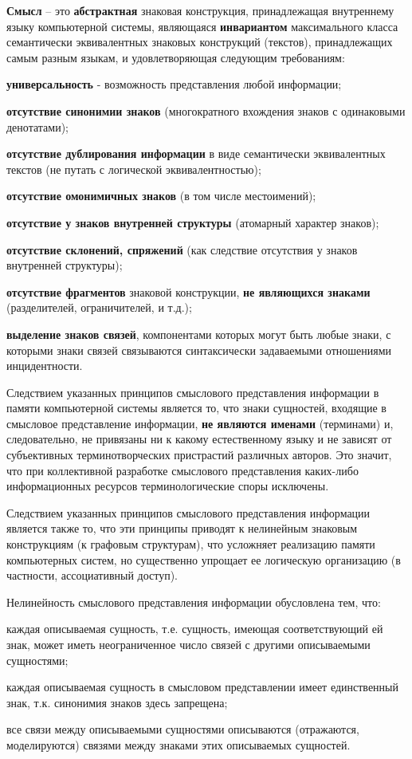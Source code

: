 \begin{SCn}
{\textbf{Смысл} – это \textbf{абстрактная} знаковая конструкция, принадлежащая внутреннему языку компьютерной системы, являющаяся \textbf{инвариантом} максимального класса семантически эквивалентных знаковых конструкций (текстов), принадлежащих самым разным языкам, и удовлетворяющая следующим требованиям:
\begin{scnitemize}
    \item \textbf{универсальность} - возможность представления любой информации;
    \item \textbf{отсутствие синонимии знаков} (многократного вхождения знаков с одинаковыми денотатами);
    \item \textbf{отсутствие дублирования информации} в виде семантически эквивалентных текстов (не путать с логической эквивалентностью);
    \item \textbf{отсутствие омонимичных знаков} (в том числе местоимений);
    \item \textbf{отсутствие у знаков внутренней структуры} (атомарный характер знаков);
    \item \textbf{отсутствие склонений, спряжений} (как следствие отсутствия у знаков внутренней структуры);
    \item \textbf{отсутствие фрагментов} знаковой конструкции, \textbf{не являющихся знаками} (разделителей, ограничителей, и т.д.);
    \item \textbf{выделение знаков связей}, компонентами которых могут быть любые знаки, с которыми знаки связей связываются синтаксически задаваемыми отношениями инцидентности.
\end{scnitemize}

Следствием указанных принципов смыслового представления информации в памяти компьютерной системы является то, что знаки сущностей, входящие в смысловое представление информации, \textbf{не являются именами} (терминами) и, следовательно, не привязаны ни к какому естественному языку и не зависят от субъективных терминотворческих пристрастий различных авторов. Это значит, что при коллективной разработке смыслового представления каких-либо информационных ресурсов терминологические споры исключены.

Следствием указанных принципов смыслового представления информации  является также то, что эти принципы приводят к нелинейным знаковым конструкциям (к графовым структурам), что усложняет реализацию памяти компьютерных систем, но существенно упрощает ее логическую организацию (в частности, ассоциативный доступ).

Нелинейность смыслового представления информации обусловлена тем, что: 
\begin{scnitemize}
    \item каждая описываемая сущность, т.е. сущность, имеющая соответствующий ей знак, может иметь неограниченное число связей с другими описываемыми сущностями;
    \item каждая описываемая сущность в смысловом представлении имеет единственный знак, т.к. синонимия знаков здесь запрещена;
    \item все связи между описываемыми сущностями описываются (отражаются, моделируются) связями между знаками этих описываемых сущностей.
\end{scnitemize}

}
\end{SCn}
